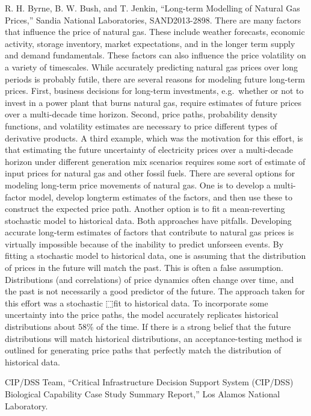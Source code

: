 \documentclass[]{article}
\begin{document}
R. H. Byrne, B. W. Bush, and T. Jenkin, ``Long-term Modelling of Natural
Gas Prices,'' Sandia National Laboratories, SAND2013-2898. There are
many factors that influence the price of natural gas. These include
weather forecasts, economic activity, storage inventory, market
expectations, and in the longer term supply and demand fundamentals.
These factors can also influence the price volatility on a variety of
timescales. While accurately predicting natural gas prices over long
periods is probably futile, there are several reasons for modeling
future long-term prices. First, business decisions for long-term
investments, e.g.~whether or not to invest in a power plant that burns
natural gas, require estimates of future prices over a multi-decade time
horizon. Second, price paths, probability density functions, and
volatility estimates are necessary to price different types of
derivative products. A third example, which was the motivation for this
effort, is that estimating the future uncertainty of electricity prices
over a multi-decade horizon under different generation mix scenarios
requires some sort of estimate of input prices for natural gas and other
fossil fuels. There are several options for modeling long-term price
movements of natural gas. One is to develop a multi-factor model,
develop longterm estimates of the factors, and then use these to
construct the expected price path. Another option is to fit a
mean-reverting stochastic model to historical data. Both approaches have
pitfalls. Developing accurate long-term estimates of factors that
contribute to natural gas prices is virtually impossible because of the
inability to predict unforseen events. By fitting a stochastic model to
historical data, one is assuming that the distribution of prices in the
future will match the past. This is often a false assumption.
Distributions (and correlations) of price dynamics often change over
time, and the past is not necessarily a good predictor of the future.
The approach taken for this effort was a stochastic ⬚fit to historical
data. To incorporate some uncertainty into the price paths, the model
accurately replicates historical distributions about 58\% of the time.
If there is a strong belief that the future distributions will match
historical distributions, an acceptance-testing method is outlined for
generating price paths that perfectly match the distribution of
historical data.

CIP/DSS Team, ``Critical Infrastructure Decision Support System
(CIP/DSS) Biological Capability Case Study Summary Report,'' Los Alamos
National Laboratory.
\end{document}
